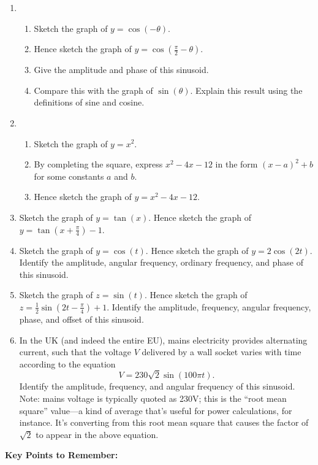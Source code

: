 \documentclass{article}
\begin{document}
\begin{enumerate}
\item \begin{enumerate}
	\item Sketch the graph of $y=\cos(-\theta)$.
	\item Hence sketch the graph of $y=\cos\left(\frac{\pi}{2}-\theta\right)$.
	\item Give the amplitude and phase of this sinusoid.
	\item Compare this with the graph of $\sin(\theta)$. Explain this result using the definitions of sine and cosine.
	\end{enumerate}
\item \begin{enumerate}
	\item Sketch the graph of $y=x^2$.
	\item By completing the square, express $x^2-4x-12$ in the form $(x-a)^2+b$ for some constants $a$ and $b$.
	\item Hence sketch the graph of $y=x^2-4x-12$.
	\end{enumerate}
\item Sketch the graph of $y=\tan(x)$. Hence sketch the graph of $y=\tan\left(x+\frac{\pi}{4}\right)-1$.
\item Sketch the graph of $y=\cos(t)$. Hence sketch the graph of $y=2\cos(2t)$. Identify the amplitude, angular frequency, ordinary frequency, and phase of this sinusoid.
\item Sketch the graph of $z=\sin(t)$. Hence sketch the graph of $z=\frac{1}{2}\sin\left(2t-\frac{\pi}{4}\right)+1$. Identify the amplitude, frequency, angular frequency, phase, and offset of this sinusoid.
\item In the UK (and indeed the entire EU), mains electricity provides alternating current, such that the voltage $V$ delivered by a wall socket varies with time according to the equation
\[V=230\sqrt{2}\sin(100\pi t).\]
Identify the amplitude, frequency, and angular frequency of this sinusoid. Note: mains voltage is typically quoted as 230V; this is the ``root mean square'' value---a kind of average that's useful for power calculations, for instance. It's converting from this root mean square that causes the factor of $\sqrt{2}$ to appear in the above equation.

\end{enumerate}




\clearpage


{\bf Key Points to Remember:}
\end{document}
